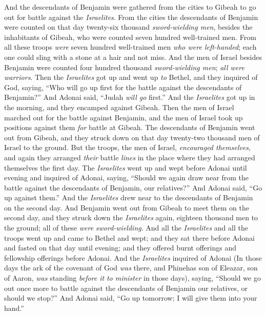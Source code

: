 \begin{biblechapter}
\verse And the descendants of Benjamin were gathered from the cities to Gibeah to go out for battle against the \textit{Israelites}.
\verse From the cities the descendants of Benjamin were counted on that day twenty-six thousand \textit{sword-wielding men}, besides the inhabitants of Gibeah, who were counted seven hundred well-trained men.
\verse From all these troops \textit{were} seven hundred well-trained men \textit{who were left-handed}; each one could sling with a stone at a hair and not miss.
\verse And the men of Israel besides Benjamin were counted four hundred thousand \textit{sword-wielding men}; \textit{all were warriors}.
\verse Then the \textit{Israelites} got up and went up \textit{to} Bethel, and they inquired of God, saying, “Who will go up first for the battle against the descendants of Benjamin?” And Adonai said, “Judah \textit{will go} first.”
\verse And the \textit{Israelites} got up in the morning, and they encamped against Gibeah.
\verse Then the men of Israel marched out for the battle against Benjamin, and the men of Israel took up positions against them \textit{for} battle at Gibeah.
\verse The descendants of Benjamin went out from Gibeah, and they struck down on that day twenty-two thousand men of Israel to the ground.
\verse But the troops, the men of Israel, \textit{encouraged themselves}, and again they arranged \textit{their} battle \textit{lines} in the place where they had arranged themselves the first day.
\verse The \textit{Israelites} went up and wept before Adonai until evening and inquired of Adonai, saying, “Should we again draw near from the battle against the descendants of Benjamin, our relatives?” And Adonai said, “Go up against them.”
\verse And the \textit{Israelites} drew near to the descendants of Benjamin on the second day.
\verse And Benjamin went out from Gibeah to meet them on the second day, and they struck down the \textit{Israelites} again, eighteen thousand men to the ground; all of these \textit{were} \textit{sword-wielding}.
\verse And all the \textit{Israelites} and all the troops went up and came to Bethel and wept; and they sat there before Adonai and fasted on that day until evening; and they offered burnt offerings and fellowship offerings before Adonai.
\verse And the \textit{Israelites} inquired of Adonai (In those days the ark of the covenant of God \textit{was} there,
\verse and Phinehas son of Eleazar, son of Aaron, \textit{was} standing \textit{before it} \textit{to minister} in those days), saying, “Should we go out once more to battle against the descendants of Benjamin our relatives, or should we stop?” And Adonai said, “Go up tomorrow; I will give them into your hand.”

\end{biblechapter}
